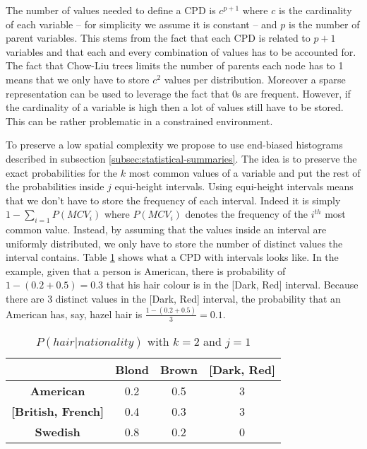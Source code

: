 \documentclass[runningheads]{llncs}
\begin{document}
The number of values needed to define a CPD is $c^{p+1}$ where $c$ is the cardinality of each variable -- for simplicity we assume it is constant -- and $p$ is the number of parent variables. This stems from the fact that each CPD is related to $p+1$ variables and that each and every combination of values has to be accounted for. The fact that Chow-Liu trees limits the number of parents each node has to 1 means that we only have to store $c^2$ values per distribution. Moreover a sparse representation can be used to leverage the fact that 0s are frequent. However, if the cardinality of a variable is high then a lot of values still have to be stored. This can be rather problematic in a constrained environment.

To preserve a low spatial complexity we propose to use end-biased histograms described in subsection \ref{subsec:statistical-summaries}. The idea is to preserve the exact probabilities for the $k$ most common values of a variable and put the rest of the probabilities inside $j$ equi-height intervals. Using equi-height intervals means that we don't have to store the frequency of each interval. Indeed it is simply $1 - \sum_{i=1}P(MCV_i)$ where $P(MCV_i)$ denotes the frequency of the $i^{th}$ most common value. Instead, by assuming that the values inside an interval are uniformly distributed, we only have to store the number of distinct values the interval contains. Table \ref{tab:compressed-hair-nationality} shows what a CPD with intervals looks like. In the example, given that a person is American, there is probability of $1 - (0.2 + 0.5) = 0.3$ that his hair colour is in the [Dark, Red] interval. Because there are 3 distinct values in the [Dark, Red] interval, the probability that an American has, say, hazel hair is $\frac{1 - (0.2 + 0.5)}{3} = 0.1$. 

\begin{table}[H]
\centering
\begin{tabular}{@{}c|ccc@{}}
                                & \textbf{Blond} & \textbf{Brown}   & \textbf{[Dark, Red]} \\ \hline
    \textbf{American}           & 0.2            & 0.5              & 3                   \\ \hline
    \textbf{[British, French]}  & 0.4            & 0.3              & 3                   \\ \hline
    \textbf{Swedish}            & 0.8            & 0.2              & 0                   \\
            \end{tabular}
        \caption{$P(hair | nationality)$ with $k=2$ and $j=1$}
        \label{tab:compressed-hair-nationality}
\vspace{-4mm}
\end{table}
\end{document}
